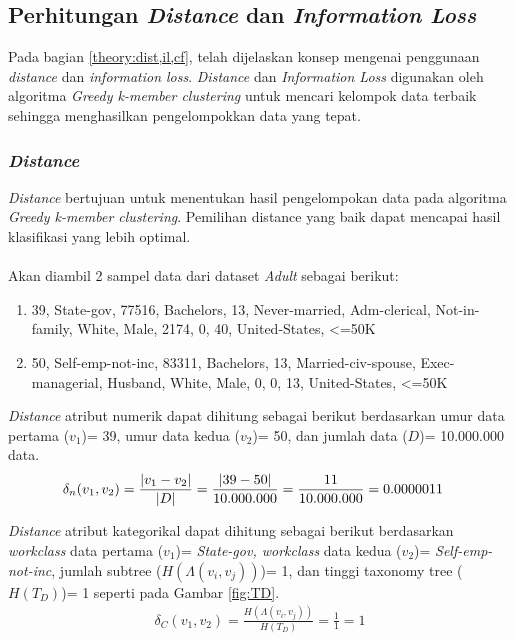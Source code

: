 \subsection{Perhitungan \textit{Distance} dan \textit{Information Loss}}
Pada bagian \ref{theory:dist,il,cf}, telah dijelaskan konsep mengenai penggunaan \textit{distance} dan \textit{information loss}. \textit{Distance} dan \textit{Information Loss} digunakan oleh algoritma \textit{Greedy k-member clustering} untuk mencari kelompok data terbaik sehingga menghasilkan pengelompokkan data yang tepat. 

\subsubsection{\textit{Distance}}
\textit{Distance} bertujuan untuk menentukan hasil pengelompokan data pada algoritma \textit{Greedy k-member clustering}. Pemilihan distance yang baik dapat mencapai hasil klasifikasi yang lebih optimal.
\\\\
\noindent Akan diambil 2 sampel data dari dataset \textit{Adult} sebagai berikut:
\begin{enumerate}
\item 39, State-gov, 77516, Bachelors, 13, Never-married, Adm-clerical, Not-in-family, White, Male, 2174, 0, 40, United-States, <=50K
\item 50, Self-emp-not-inc, 83311, Bachelors, 13, Married-civ-spouse, Exec-managerial, Husband, White, Male, 0, 0, 13, United-States, <=50K
\end{enumerate}

\noindent \textit{Distance} atribut numerik dapat dihitung sebagai berikut berdasarkan umur data pertama ($v_1$)= 39, umur data kedua ($v_2$)= 50, dan jumlah data ($D$)= 10.000.000 data.
\begin{align*}
\delta_n(v_1,v_2) &= \frac{|v_1 - v_2|}{|D|}
= \frac{|39 - 50|}{10.000.000}\vspace{0.2cm}
= \frac{11}{10.000.000}\vspace{0.2cm}
= 0.0000011
\end{align*}

\noindent \textit{Distance} atribut kategorikal dapat dihitung sebagai berikut berdasarkan \textit{workclass} data pertama ($v_1$)= \textit{State-gov, workclass} data kedua ($v_2$)= \textit{Self-emp-not-inc}, jumlah subtree ($H(\Lambda(v_i,v_j))$)= 1, dan tinggi taxonomy tree ($H(T_D)$)= 1  seperti pada Gambar \ref{fig:TD}.
\begin{align*}
\delta_C(v_1,v_2) = \frac{H(\Lambda(v_i,v_j))}{H(T_D)} 
= \frac{1}{1}
= 1
\end{align*}

